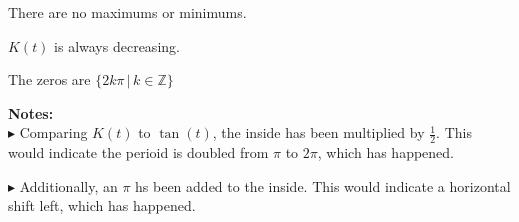 \documentclass{ximera}
\begin{document}
\begin{example}
\begin{explanation}
\begin{image}
\end{image}

There are no maximums or minimums.

$K(t)$ is always decreasing.

The zeros are $\{  2 k \pi \, | \, k \in \mathbb{Z}    \}$














\end{explanation}
\textbf{Notes:} \\


$\blacktriangleright$ Comparing $K(t)$ to $\tan(t)$, the inside has been multiplied by $\frac{1}{2}$.  This would indicate the perioid is doubled from $\pi$ to $2\pi$, which has happened.  

$\blacktriangleright$ Additionally, an $\pi$ hs been added to the inside.  This would indicate a horizontal shift left, which has happened.


\end{example}
\end{document}
